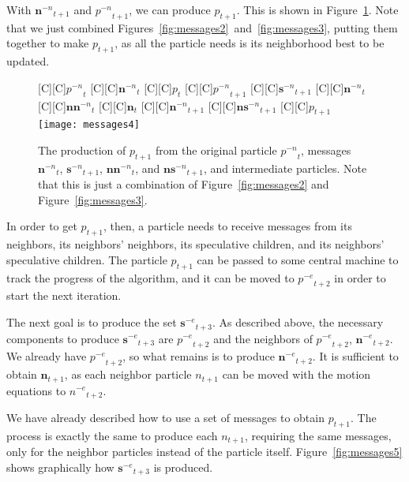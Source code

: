 \documentclass[journal,letterpaper]{IEEEtran}
\newcommand{\fig}[1]{Figure~\ref{fig:#1}}
\providecommand{\noeval}[1]{\ensuremath{#1^{-e}}}
\providecommand{\nonbest}[1]{\ensuremath{#1^{-n}}}
\providecommand{\p}{\ensuremath{p}}
\providecommand{\sset}{\ensuremath{\mathbf{s}}}
\providecommand{\nsset}{\ensuremath{\mathbf{ns}}}
\providecommand{\n}{\ensuremath{n}}
\providecommand{\nset}{\ensuremath{\mathbf{n}}}
\providecommand{\nnset}{\ensuremath{\mathbf{nn}}}
\begin{document}
With $\nonbest{\nset}_{t+1}$ and $\nonbest{\p}_{t+1}$, we can produce
$\p_{t+1}$.  This is shown in \fig{messages4}.  Note that we just combined
Figures~\ref{fig:messages2}~and~\ref{fig:messages3}, putting them together
to make $\p_{t+1}$, as all the particle needs is its neighborhood best to be
updated.

\begin{figure}
  \centering
  [C][C]{$\nonbest{\p}_{t}$}
  [C][C]{$\nonbest{\nset}_{t}$}
  [C][C]{$\p_{t}$}
  [C][C]{$\nonbest{\p}_{t+1}$}
  [C][C]{$\nonbest{\sset}_{t+1}$}
  [C][C]{$\nonbest{\nset}_{t}$}
  [C][C]{$\nonbest{\nnset}_{t}$}
  [C][C]{$\nset_{t}$}
  [C][C]{$\nonbest{\nset}_{t+1}$}
  [C][C]{$\nonbest{\nsset}_{t+1}$}
  [C][C]{$\p_{t+1}$}
  \texttt{[image: messages4]}
  \caption{The production of $\p_{t+1}$ from the original particle 
  $\nonbest{\p}_{t}$, messages $\nonbest{\nset}_{t}$, $\nonbest{\sset}_{t+1}$,
  $\nonbest{\nnset}_{t}$, and $\nonbest{\nsset}_{t+1}$, and intermediate
  particles.  Note that this is just a combination of \fig{messages2} and
  \fig{messages3}.}
  \label{fig:messages4}
\end{figure}

In order to get $\p_{t+1}$, then, a particle needs to receive messages from its
neighbors, its neighbors' neighbors, its speculative children, and its
neighbors' speculative children.  The particle $\p_{t+1}$ can be passed to some
central machine to track the progress of the algorithm, and it can be moved to
$\noeval{\p}_{t+2}$ in order to start the next iteration.

The next goal is to produce the set $\noeval{\sset}_{t+3}$.  As described
above, the necessary components to produce $\noeval{\sset}_{t+3}$ are
$\noeval{\p}_{t+2}$ and the neighbors of $\noeval{\p}_{t+2}$,
$\noeval{\nset}_{t+2}$.  We already have $\noeval{\p}_{t+2}$, so what remains
is to produce $\noeval{\nset}_{t+2}$.  It is sufficient to obtain
$\nset_{t+1}$, as each neighbor particle $\n_{t+1}$ can be moved with the
motion equations to $\noeval{\n}_{t+2}$.

We have already described how to use a set of messages to obtain $\p_{t+1}$.
The process is exactly the same to produce each $\n_{t+1}$, requiring the same
messages, only for the neighbor particles instead of the particle itself.
\fig{messages5} shows graphically how $\noeval{\sset}_{t+3}$ is produced.
\end{document}
